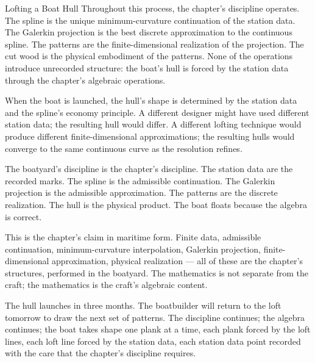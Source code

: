\begin{coda}{Lofting a Boat Hull}
Throughout this process, the chapter's discipline operates. The
spline is the unique minimum-curvature continuation of the station
data. The Galerkin projection is the best discrete approximation
to the continuous spline. The patterns are the finite-dimensional
realization of the projection. The cut wood is the physical
embodiment of the patterns. None of the operations introduce
unrecorded structure: the boat's hull is forced by the station
data through the chapter's algebraic operations.

When the boat is launched, the hull's shape is determined by the
station data and the spline's economy principle. A different
designer might have used different station data; the resulting
hull would differ. A different lofting technique would produce
different finite-dimensional approximations; the resulting hulls
would converge to the same continuous curve as the resolution
refines.

The boatyard's discipline is the chapter's discipline. The
station data are the recorded marks. The spline is the admissible
continuation. The Galerkin projection is the admissible
approximation. The patterns are the discrete realization. The
hull is the physical product. The boat floats because the algebra
is correct.

This is the chapter's claim in maritime form. Finite data, admissible
continuation, minimum-curvature interpolation, Galerkin projection,
finite-dimensional approximation, physical realization --- all of
these are the chapter's structures, performed in the boatyard. The
mathematics is not separate from the craft; the mathematics is the
craft's algebraic content.

The hull launches in three months. The boatbuilder will return to
the loft tomorrow to draw the next set of patterns. The discipline
continues; the algebra continues; the boat takes shape one plank at
a time, each plank forced by the loft lines, each loft line forced
by the station data, each station data point recorded with the
care that the chapter's discipline requires.

\end{coda}
